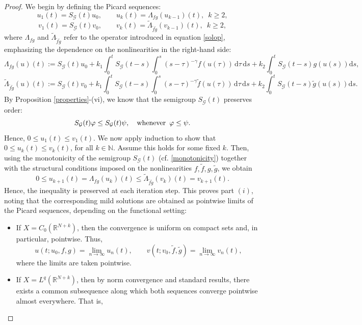 \documentclass[a4,psfig,english,12pt,epsf,portrait]{article}
\numberwithin{equation}{section}
\def\N{\mathbb{N}}
\begin{document}
\begin{proof} We begin by defining the Picard sequences:
	$$u_{1}(t) =S_\mathcal{G}(t)u_0,\qquad u_{k}(t) =\Lambda_{fg} (u_{k-1})(t),\,\,\, k\geq2 ,$$
	$$v_{1}(t) =S_\mathcal{G}(t)v_0 ,\qquad v_{k}(t) =\widetilde{\Lambda}_{\tilde{f}\tilde{g}} (v_{k-1})(t),\,\,\, k\geq2 , $$
	where $\Lambda_{fg}$ and $\widetilde{\Lambda}_{\tilde{f}\tilde{g}}$ refer to the operator introduced in equation \eqref{solop}, emphasizing the dependence on the nonlinearities in the right-hand side:
	\begin{equation}\label{lambdafg}
		\Lambda_{fg}(u)(t):=S_{\mathcal{G}}(t)u_0 +k_1 \int_{0}^{t}S_{\mathcal{G}}(t-s) \int_0^s(s-\tau)^{-\gamma}f(u(\tau))\, \mathrm{d}\tau \,\mathrm{d}s +k_2 \int_{0}^{t}S_{\mathcal{G}}(t-s)g(u(s)) \mathrm{d}s,
	\end{equation}
	$$\widetilde{\Lambda}_{\tilde{f}\tilde{g}}(u)(t):=S_{\mathcal{G}}(t)v_0 +k_1 \int_{0}^{t}S_{\mathcal{G}}(t-s) \int_0^s(s-\tau)^{-\gamma}\tilde{f}(u(\tau))\, \mathrm{d}\tau \,\mathrm{d}s +k_2 \int_{0}^{t}S_{\mathcal{G}}(t-s)\tilde{g}(u(s)) \mathrm{d}s.$$
	By Proposition \ref{properties}-(vi), we know that the semigroup $S_\mathcal{G}(t)$ preserves order:
	\begin{equation}\label{monotonicity}
		S_\mathcal{G}( t)\varphi \leq S_\mathcal{G}(t)\psi,\quad \hbox{whenever}\,\,\, \varphi\leq \psi.
	\end{equation} 
	Hence, $0\leq u_1(t)\leq v_1(t)$. We now apply induction to show that $0\leq u_k(t)\leq v_k(t)$, for all $k\in\N$. Assume this holds for some fixed $k$. Then, using the monotonicity of the semigroup $S_\mathcal{G}(t)$ (cf. \eqref{monotonicity}) together with the structural conditions imposed on the nonlinearities $f, \tilde{f},g,\tilde{g}$, we obtain
	$$0\leq u_{k+1}(t)=\Lambda_{fg}(u_k)(t)\leq \widetilde{\Lambda}_{\tilde{f}\tilde{g}}(v_k)(t)=v_{k+1}(t).$$
	Hence, the inequality is preserved at each iteration step. This proves part $(i)$, noting that the corresponding mild solutions are obtained as pointwise limits of the Picard sequences, depending on the functional setting:
	\begin{itemize}
		\item  If $X=C_0(\mathbb{R}^{N+k})$, then the convergence is uniform on compact sets and, in particular, pointwise. Thus,
		$$u(t;u_0,f,g) = \lim\limits_{n\rightarrow\infty} u_n(t),\qquad  v(t;v_0,\tilde{f},\tilde{g}) = \lim\limits_{n\rightarrow\infty} v_n(t),$$
		where the limits are taken pointwise.
		\item  If $X=L^q(\mathbb{R}^{N+k})$,  then by norm convergence and standard results, there exists a common subsequence along which both sequences converge pointwise almost everywhere. That is,

\end{itemize}
\end{proof}
\end{document}
